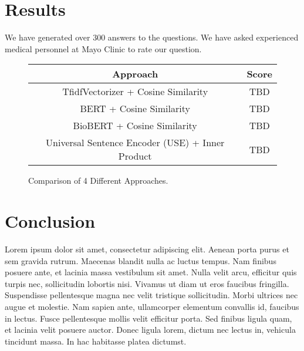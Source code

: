 \documentclass[sigconf,natbib=false]{acmart}
\begin{document}

\section{Results}

We have generated over 300 answers to the questions. We have asked experienced
medical personnel at Mayo Clinic to rate our question.

\begin{figure}[H]
  \centering
  \begin{tabular}{*{2}{c}}
    \toprule
    Approach & Score\\
    \midrule
    TfidfVectorizer + Cosine Similarity & TBD\\
    \midrule
    BERT + Cosine Similarity & TBD\\
    \midrule
    BioBERT + Cosine Similarity & TBD\\
    \midrule
    Universal Sentence Encoder (USE) + Inner Product & TBD\\
    \bottomrule
  \end{tabular}
  \caption{Comparison of 4 Different Approaches.}
\end{figure}



\section{Conclusion}

Lorem ipsum dolor sit amet, consectetur adipiscing elit. Aenean porta purus et
sem gravida rutrum. Maecenas blandit nulla ac luctus tempus. Nam finibus
posuere ante, et lacinia massa vestibulum sit amet. Nulla velit arcu, efficitur
quis turpis nec, sollicitudin lobortis nisi. Vivamus ut diam ut eros faucibus
fringilla. Suspendisse pellentesque magna nec velit tristique sollicitudin.
Morbi ultrices nec augue et molestie. Nam sapien ante, ullamcorper elementum
convallis id, faucibus in lectus. Fusce pellentesque mollis velit efficitur
porta. Sed finibus ligula quam, et lacinia velit posuere auctor. Donec ligula
lorem, dictum nec lectus in, vehicula tincidunt massa. In hac habitasse platea
dictumst.


\printbibliography%
\end{document}

